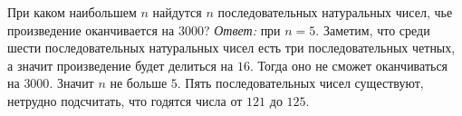 \problem
При каком наибольшем $n$ найдутся $n$ последовательных натуральных чисел, чье
произведение оканчивается на $3000$?
\solution
\emph{Ответ:} при $n = 5$.
Заметим, что среди шести последовательных натуральных чисел есть три
последовательных четных, а значит произведение будет делиться на $16$.
Тогда оно не сможет оканчиваться на $3000$.
Значит $n$ не больше $5$.
Пять последовательных чисел существуют, нетрудно подсчитать, что годятся числа
от $121$ до $125$.
\endproblem
